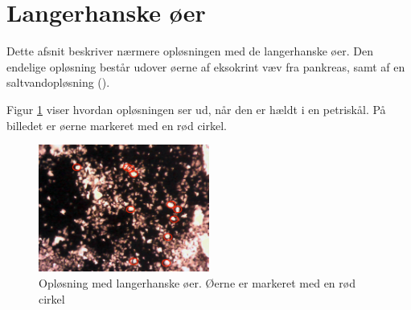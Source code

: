 %
%
%
%
%

\newpage
\section{Langerhanske øer}
Dette afsnit beskriver nærmere opløsningen med de langerhanske øer. Den endelige opløsning består udover øerne af eksokrint væv fra pankreas, samt af en saltvandopløsning (\cite{hbbs}). 

Figur \ref{fig:islet} viser hvordan opløsningen ser ud, når den er hældt i en petriskål. På billedet er øerne markeret med en rød cirkel.

\begin{figure}[H]
	\centering
	\includegraphics[width=0.5\textwidth]{billeder/software/sgbillede.png}
	\caption{Opløsning med langerhanske øer. Øerne er markeret med en rød cirkel}
	\label{fig:islet}
\end{figure}

